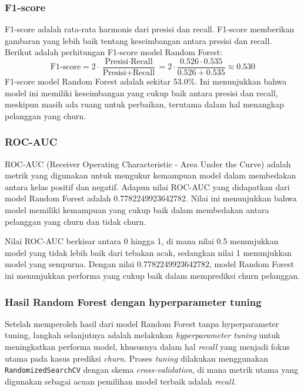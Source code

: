 \subsubsection*{F1-score}
F1-score adalah rata-rata harmonis dari presisi dan recall. F1-score memberikan gambaran yang lebih baik tentang keseimbangan antara presisi dan recall. Berikut adalah perhitungan F1-score model Random Forest:
\begin{equation}
    \text{F1-score} = 2 \cdot \frac{\text{Presisi} \cdot \text{Recall}}{\text{Presisi} + \text{Recall}} = 2 \cdot \frac{0.526 \cdot 0.535}{0.526 + 0.535} \approx 0.530
\end{equation}
F1-score model Random Forest adalah sekitar 53.0\%. Ini menunjukkan bahwa model ini memiliki keseimbangan yang cukup baik antara presisi dan recall, meskipun masih ada ruang untuk perbaikan, terutama dalam hal menangkap pelanggan yang churn.

\subsubsection*{ROC-AUC}
ROC-AUC (Receiver Operating Characteristic - Area Under the Curve) adalah metrik yang digunakan untuk mengukur kemampuan model dalam membedakan antara kelas positif dan negatif. Adapun nilai ROC-AUC yang didapatkan dari model Random Forest adalah 0.7782249923642782. Nilai ini menunjukkan bahwa model memiliki kemampuan yang cukup baik dalam membedakan antara pelanggan yang churn dan tidak churn.

Nilai ROC-AUC berkisar antara 0 hingga 1, di mana nilai 0.5 menunjukkan model yang tidak lebih baik dari tebakan acak, sedangkan nilai 1 menunjukkan model yang sempurna. Dengan nilai 0.7782249923642782, model Random Forest ini menunjukkan performa yang cukup baik dalam memprediksi churn pelanggan.

\subsubsection{Hasil Random Forest dengan hyperparameter tuning}
Setelah memperoleh hasil dari model Random Forest tanpa hyperparameter tuning, langkah selanjutnya adalah melakukan \textit{hyperparameter tuning} untuk meningkatkan performa model, khususnya dalam hal \textit{recall} yang menjadi fokus utama pada kasus prediksi \textit{churn}. Proses \textit{tuning} dilakukan menggunakan \texttt{RandomizedSearchCV} dengan skema \textit{cross-validation}, di mana metrik utama yang digunakan sebagai acuan pemilihan model terbaik adalah \textit{recall}.

